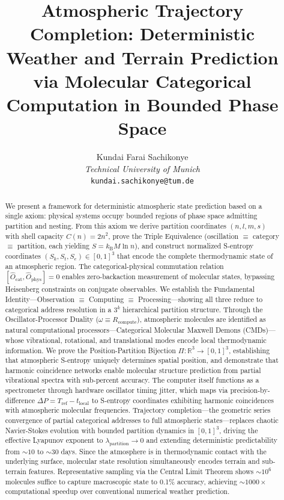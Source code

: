 \documentclass[twocolumn,10pt]{article}
\title{\textbf{Atmospheric Trajectory Completion: Deterministic Weather and Terrain Prediction via Molecular Categorical Computation in Bounded Phase Space}}
\author{
  Kundai Farai Sachikonye \\
  \textit{Technical University of Munich} \\
  \texttt{kundai.sachikonye@tum.de}
}
\date{}
\theoremstyle{definition}
\begin{document}

\maketitle

\begin{abstract}
We present a framework for deterministic atmospheric state prediction based on a single axiom: physical systems occupy bounded regions of phase space admitting partition and nesting. From this axiom we derive partition coordinates $(n, l, m, s)$ with shell capacity $C(n) = 2n^2$, prove the Triple Equivalence (oscillation $\equiv$ category $\equiv$ partition, each yielding $S = k_{\mathrm{B}} M \ln n$), and construct normalized S-entropy coordinates $(S_k, S_t, S_e) \in [0,1]^3$ that encode the complete thermodynamic state of an atmospheric region. The categorical-physical commutation relation $[\hat{O}_{\mathrm{cat}}, \hat{O}_{\mathrm{phys}}] = 0$ enables zero-backaction measurement of molecular states, bypassing Heisenberg constraints on conjugate observables. We establish the Fundamental Identity---Observation $\equiv$ Computing $\equiv$ Processing---showing all three reduce to categorical address resolution in a $3^k$ hierarchical partition structure. Through the Oscillator-Processor Duality ($\omega \equiv R_{\mathrm{compute}}$), atmospheric molecules are identified as natural computational processors---Categorical Molecular Maxwell Demons (CMDs)---whose vibrational, rotational, and translational modes encode local thermodynamic information. We prove the Position-Partition Bijection $\Pi: \mathbb{R}^3 \to [0,1]^3$, establishing that atmospheric S-entropy uniquely determines spatial position, and demonstrate that harmonic coincidence networks enable molecular structure prediction from partial vibrational spectra with sub-percent accuracy. The computer itself functions as a spectrometer through hardware oscillator timing jitter, which maps via precision-by-difference $\Delta P = T_{\mathrm{ref}} - t_{\mathrm{local}}$ to S-entropy coordinates exhibiting harmonic coincidences with atmospheric molecular frequencies. Trajectory completion---the geometric series convergence of partial categorical addresses to full atmospheric states---replaces chaotic Navier-Stokes evolution with bounded partition dynamics in $[0,1]^3$, driving the effective Lyapunov exponent to $\lambda_{\mathrm{partition}} \to 0$ and extending deterministic predictability from ${\sim}10$ to ${\sim}30$ days. Since the atmosphere is in thermodynamic contact with the underlying surface, molecular state resolution simultaneously encodes terrain and sub-terrain features. Representative sampling via the Central Limit Theorem shows ${\sim}10^6$ molecules suffice to capture macroscopic state to 0.1\% accuracy, achieving ${\sim}1000\times$ computational speedup over conventional numerical weather prediction.
\end{abstract}
\end{document}
